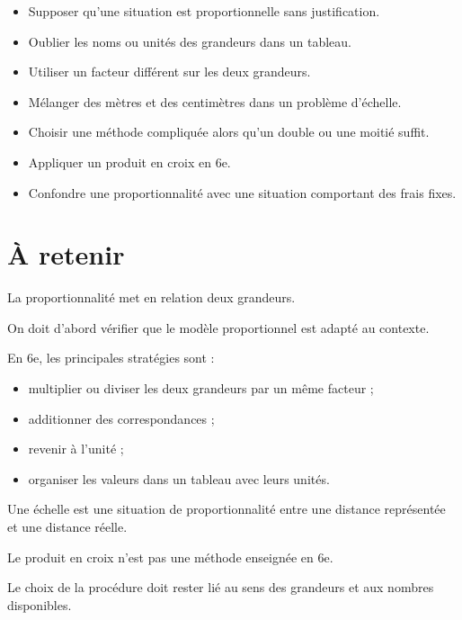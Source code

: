 \begin{itemize}
\item Supposer qu'une situation est proportionnelle sans justification.
\item Oublier les noms ou unités des grandeurs dans un tableau.
\item Utiliser un facteur différent sur les deux grandeurs.
\item Mélanger des mètres et des centimètres dans un problème d'échelle.
\item Choisir une méthode compliquée alors qu'un double ou une moitié suffit.
\item Appliquer un produit en croix en 6e.
\item Confondre une proportionnalité avec une situation comportant des frais fixes.
\end{itemize}

\section{À retenir}

\begin{aretenir}
La proportionnalité met en relation deux grandeurs.

On doit d'abord vérifier que le modèle proportionnel est adapté au contexte.

En 6e, les principales stratégies sont :
\begin{itemize}
\item multiplier ou diviser les deux grandeurs par un même facteur ;
\item additionner des correspondances ;
\item revenir à l'unité ;
\item organiser les valeurs dans un tableau avec leurs unités.
\end{itemize}

Une échelle est une situation de proportionnalité entre une distance représentée et une distance réelle.

Le produit en croix n'est pas une méthode enseignée en 6e.

Le choix de la procédure doit rester lié au sens des grandeurs et aux nombres disponibles.
\end{aretenir}
